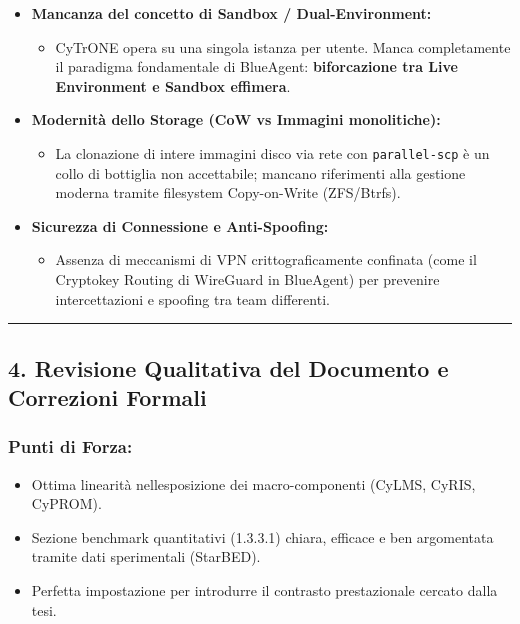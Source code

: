 \begin{itemize}
\tightlist
\item
  \textbf{Mancanza del concetto di Sandbox / Dual-Environment:}

  \begin{itemize}
  \tightlist
  \item
    CyTrONE opera su una singola istanza per utente. Manca completamente
    il paradigma fondamentale di BlueAgent: \textbf{biforcazione tra
    Live Environment e Sandbox effimera}.
  \end{itemize}
\item
  \textbf{Modernità dello Storage (CoW vs Immagini monolitiche):}

  \begin{itemize}
  \tightlist
  \item
    La clonazione di intere immagini disco via rete con
    \passthrough{\lstinline!parallel-scp!} è un collo di bottiglia non
    accettabile; mancano riferimenti alla gestione moderna tramite
    filesystem Copy-on-Write (ZFS/Btrfs).
  \end{itemize}
\item
  \textbf{Sicurezza di Connessione e Anti-Spoofing:}

  \begin{itemize}
  \tightlist
  \item
    Assenza di meccanismi di VPN crittograficamente confinata (come il
    Cryptokey Routing di WireGuard in BlueAgent) per prevenire
    intercettazioni e spoofing tra team differenti.
  \end{itemize}
\end{itemize}

\begin{center}\rule{0.5\linewidth}{0.5pt}\end{center}

\subsection{4. Revisione Qualitativa del Documento e Correzioni
Formali}\label{4-revisione-qualitativa-del-documento-e-correzioni-formali}

\subsubsection{Punti di Forza:}\label{punti-di-forza}

\begin{itemize}
\tightlist
\item
  Ottima linearità nell\textquotesingle esposizione dei macro-componenti
  (CyLMS, CyRIS, CyPROM).
\item
  Sezione benchmark quantitativi (1.3.3.1) chiara, efficace e ben
  argomentata tramite dati sperimentali (StarBED).
\item
  Perfetta impostazione per introdurre il contrasto prestazionale
  cercato dalla tesi.
\end{itemize}

